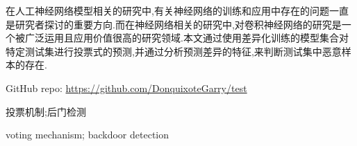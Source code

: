 

\begin{zhaiyao}
\begin{spacing}{1.5}
{

在人工神经网络模型相关的研究中,有关神经网络的训练和应用中存在的问题一直是研究者探讨的重要方向.而在神经网络相关的研究中,对卷积神经网络的研究是一个被广泛运用且应用价值很高的研究领域.本文通过使用差异化训练的模型集合对特定测试集进行投票式的预测,并通过分析预测差异的特征,来判断测试集中恶意样本的存在.

GitHub repo: \url{https://github.com/DonquixoteGarry/test}
}
\end{spacing}
\end{zhaiyao}

\begin{guanjianci}
投票机制;后门检测
\end{guanjianci}



\begin{abstract}
\begin{spacing}{1.5}

In the research of ANN's models, the puzzles about training and application of them are always a main direction for researchers. And in the research of DNN, CNN is a widely applied direction with high value. In this essay, via the predicting the results for test dataset by a model set which is trained with different train dataset, we can analysis the features about them and distinguish differences of malicious samples and normal samples.

\end{spacing}
\end{abstract}


\begin{keywords}
voting mechanism; backdoor detection
\end{keywords} 
